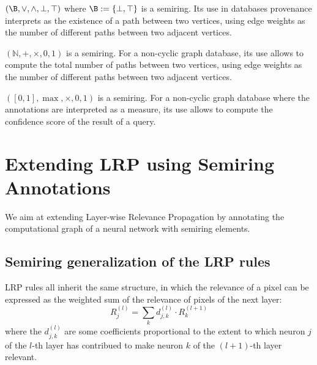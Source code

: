 \documentclass{../cs-classes/cs-classes}
\newcommand*{\1}{\digitsbb{1}}
\newcommand*{\0}{\digitsbb{0}}
\begin{document}
\begin{example}
    $(\B, \lor, \land, \bot, \top)$ where $\B:=\{\bot, \top\}$ is a semiring. Its use in databases provenance interprets as the existence of a path between two vertices, using edge weights as the number of different paths between two adjacent vertices. 
\end{example}

\begin{example}
    $(\mathbb{N}, +, \times, 0, 1)$ is a semiring. For a non-cyclic graph database, its use allows to compute the total number of paths between two vertices, using edge weights as the number of different paths between two adjacent vertices.
\end{example}

\begin{example}
    $([0, 1], \max, \times, 0, 1)$ is a semiring. For a non-cyclic graph database where the annotations are interpreted as a  measure, its use allows to compute the confidence score of the result of a query.
\end{example}

\section{Extending LRP using Semiring Annotations}
We aim at extending Layer-wise Relevance Propagation by annotating the computational graph of a neural network with semiring elements.

\subsection{Semiring generalization of the LRP rules}
LRP rules all inherit the same structure, in which the relevance of a pixel can be expressed as the weighted sum of the relevance of pixels of the next layer:
\begin{equation}
    R_j^{(l)} = \sum_k d_{j, k}^{(l)} \cdot R_k^{(l+1)}
    \label{eq:general-lrp}
\end{equation}
where the $d_{j,k}^{(l)}$ are some coefficients proportional to the extent to which neuron $j$ of the $l$-th layer has contribued to make neuron $k$ of the $(l+1)$-th layer relevant.
\end{document}
